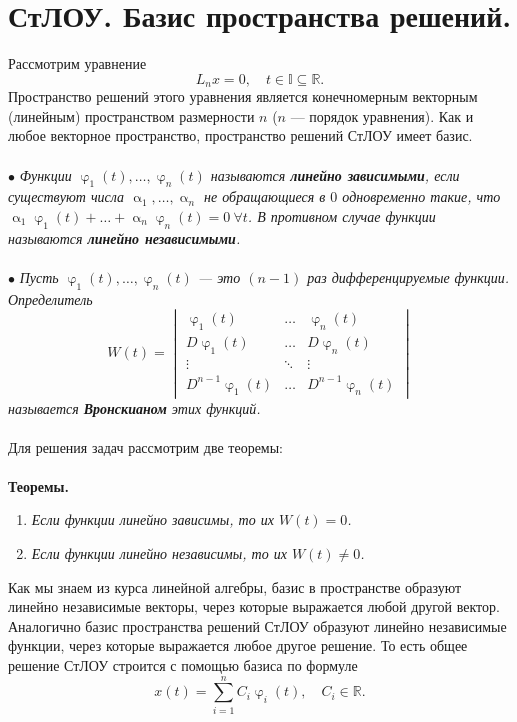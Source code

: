 \documentclass[a4paper, 12pt]{article}
\newcommand{\Rm}{\mathbb{R}}
\newcommand{\I}{\mathbb{I}}
\renewcommand{\varphi}{\upvarphi}
\renewcommand{\alpha}{\upalpha}
\begin{document}
	\section*{СтЛОУ. Базис пространства решений.}
	Рассмотрим уравнение $$L_nx = 0,\quad t\in \I\subseteq\Rm.$$
	Пространство решений этого уравнения является конечномерным векторным (линейным) пространством размерности $n$ ($n$ --- порядок уравнения). Как и любое векторное пространство, пространство решений СтЛОУ имеет базис.\\\\
	$\bullet$ \textit{Функции $\varphi_1(t),\ldots,\varphi_n(t)$ называются \textbf{линейно зависимыми}, если существуют числа $\alpha_1,\ldots, \alpha_n$ не обращающиеся в $0$ одновременно такие, что $\alpha_1\varphi_1(t) + \ldots + \alpha_n\varphi_n(t) = 0\ \forall t$. В противном случае функции называются \textbf{линейно независимыми}.}\\\\
	$\bullet$ \textit{Пусть $\varphi_1(t),\ldots,\varphi_n(t)$ --- это $(n-1)$ раз дифференцируемые функции. Определитель $$W(t) = \begin{vmatrix}
			\varphi_1(t) & \dots & \varphi_n(t)\\
			D\varphi_1(t) & \dots & D\varphi_n(t)\\
			\vdots & \ddots & \vdots\\
			D^{n-1}\varphi_1(t) & \dots & D^{n-1}\varphi_n(t)
	\end{vmatrix}$$ называется \textbf{Вронскианом} этих функций.}\\\\
	Для решения задач рассмотрим две теоремы:\\\\
	\textbf{Теоремы.}\begin{enumerate}
		\item \textit{Если функции линейно зависимы, то их $W(t) = 0$.}
		\item \textit{Если функции линейно независимы, то их $W(t) \ne 0$.}
	\end{enumerate}
	Как мы знаем из курса линейной алгебры, базис в пространстве образуют линейно независимые векторы, через которые выражается любой другой вектор. Аналогично базис пространства решений СтЛОУ образуют линейно независимые функции, через которые выражается любое другое решение. То есть общее решение СтЛОУ строится с помощью базиса по формуле $$x(t) = \sum_{i = 1}^{n}C_i\varphi_i(t),\quad C_i \in \Rm.$$\\\\
\end{document}
